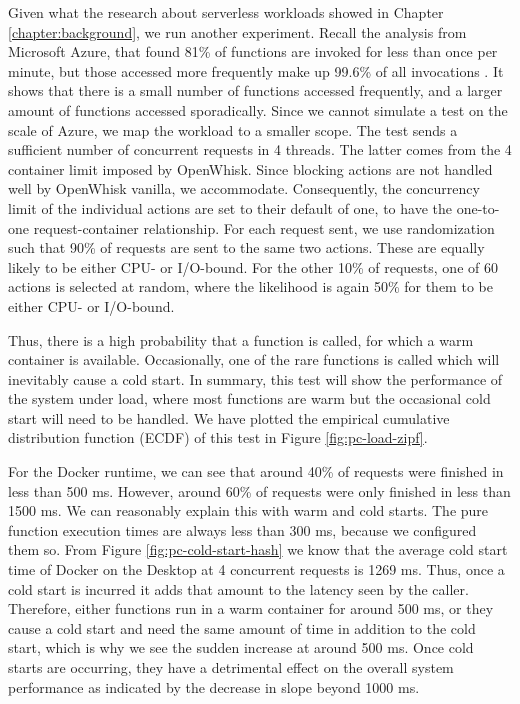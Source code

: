 Given what the research about serverless workloads showed in Chapter \ref{chapter:background}, we run another experiment. Recall the analysis from Microsoft Azure, that found 81\% of functions are invoked for less than once per minute, but those accessed more frequently make up 99.6\% of all invocations \cite{Shahrad2020}.
It shows that there is a small number of functions accessed frequently, and a larger amount of functions accessed sporadically.
Since we cannot simulate a test on the scale of Azure, we map the workload to a smaller scope. The test sends a sufficient number of concurrent requests in 4 threads. The latter comes from the 4 container limit imposed by OpenWhisk. Since blocking actions are not handled well by OpenWhisk vanilla, we accommodate. Consequently, the concurrency limit of the individual actions are set to their default of one, to have the one-to-one request-container relationship. For each request sent, we use randomization such that 90\% of requests are sent to the same two actions. These are equally likely to be either CPU- or I/O-bound. For the other 10\% of requests, one of 60 actions is selected at random, where the likelihood is again 50\% for them to be either CPU- or I/O-bound.

Thus, there is a high probability that a function is called, for which a warm container is available. Occasionally, one of the rare functions is called which will inevitably cause a cold start. In summary, this test will show the performance of the system under load, where most functions are warm but the occasional cold start will need to be handled. We have plotted the empirical cumulative distribution function (ECDF) of this test in Figure \ref{fig:pc-load-zipf}.

For the Docker runtime, we can see that around 40\% of requests were finished in less than 500 ms. However, around 60\% of requests were only finished in less than 1500 ms. We can reasonably explain this with warm and cold starts. The pure function execution times are always less than 300 ms, because we configured them so. From Figure \ref{fig:pc-cold-start-hash} we know that the average cold start time of Docker on the Desktop at 4 concurrent requests is 1269 ms. Thus, once a cold start is incurred it adds that amount to the latency seen by the caller. Therefore, either functions run in a warm container for around 500 ms, or they cause a cold start and need the same amount of time in addition to the cold start, which is why we see the sudden increase at around 500 ms. Once cold starts are occurring, they have a detrimental effect on the overall system performance as indicated by  the decrease in slope beyond 1000 ms.

